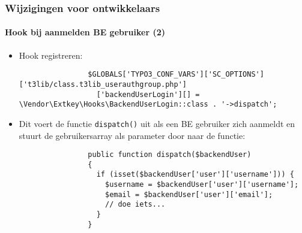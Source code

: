 \begin{frame}[fragile]
	\frametitle{Wijzigingen voor ontwikkelaars}
	\framesubtitle{Hook bij aanmelden BE gebruiker (2)}

	\lstset{basicstyle=\tiny\ttfamily}

	\begin{itemize}
		\item Hook registreren:

			\begin{lstlisting}
				$GLOBALS['TYPO3_CONF_VARS']['SC_OPTIONS']['t3lib/class.t3lib_userauthgroup.php']
				  ['backendUserLogin'][] = \Vendor\Extkey\Hooks\BackendUserLogin::class . '->dispatch';
			\end{lstlisting}

		\item Dit voert de functie \texttt{dispatch()} uit als een BE gebruiker zich aanmeldt en stuurt
			de gebruikersarray als parameter door naar de functie:

			\begin{lstlisting}
				public function dispatch($backendUser)
				{
				  if (isset($backendUser['user']['username'])) {
				    $username = $backendUser['user']['username'];
				    $email = $backendUser['user']['email'];
				    // doe iets...
				  }
				}
			\end{lstlisting}

	\end{itemize}

\end{frame}

